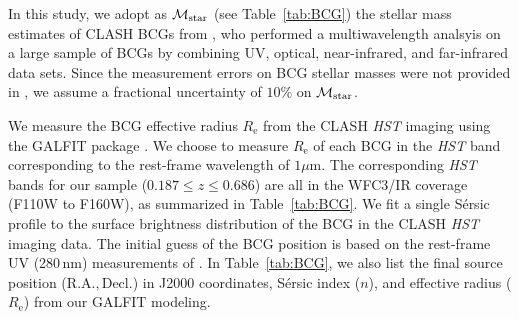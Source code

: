 \documentclass[a4paper,iop,twocolumn,twocolappendix,numberedappendix,appendixfloats]{emulateapj}
\newcommand{\percent}{\ensuremath{\%}}
\begin{document}
In this study, we adopt as ${\cal M}_\mathrm{star}$ (see
Table~\ref{tab:BCG}) the stellar mass
estimates of CLASH BCGs from \citet[][their Table 1]{Cooke16}, who performed a
multiwavelength analsyis on a large sample of BCGs by combining UV,
optical, near-infrared, and far-infrared data sets.
Since the measurement errors on BCG stellar masses were not
provided in \citet{Cooke16}, we assume a fractional uncertainty of
$10\percent$ on ${\cal M}_\mathrm{star}$.

We measure the BCG effective radius $R_\mathrm{e}$
from the CLASH {\em HST} imaging using the GALFIT package \citep{Peng10}.
We choose to measure $R_\mathrm{e}$ of each BCG in
the {\em HST} band corresponding to the rest-frame wavelength of $1\mu$m.
The corresponding {\em HST} bands for our sample ($0.187\le z\le 0.686$)
are all in the WFC3/IR coverage (F110W to F160W), as summarized in
Table~\ref{tab:BCG}.
We fit a single S\'ersic
profile to the surface brightness
distribution of the BCG in the
CLASH {\em HST} imaging data.
The initial guess of the BCG position is
based on the rest-frame UV (280\,nm) measurements of \citet{Donahue15}.
In Table~\ref{tab:BCG}, we also list the final source position
($\mathrm{R.A.}, \mathrm{Decl.}$) in J2000 coordinates,
S\'ersic index ($n$), and effective radius ($R_\mathrm{e}$) from our GALFIT modeling.


\end{document}
